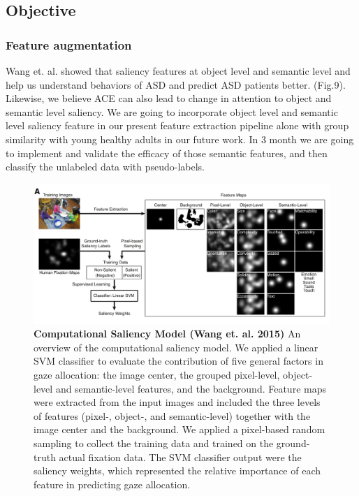 \documentclass[a4paper, times, 12pt, ,onecolumn,oneside,top=1.0cm,bottom=1.0cm,left=1.0 cm,right=1cm]{article}
\begin{document}
\subsection{Objective}

\subsubsection{Feature augmentation} Wang et. al. \cite{pmid26593094} showed that saliency features at object level and semantic level and help us understand behaviors of ASD and predict ASD patients better. (Fig.9). Likewise, we believe ACE can also lead to change in attention to object and semantic level saliency. We are going to incorporate object level and semantic level saliency feature in our present feature extraction pipeline alone with group similarity with young healthy adults in our future work. In 3 month we are going to implement and validate the efficacy of those semantic features, and then classify the unlabeled data with pseudo-labels.


\begin{figure}[ht]
  \centering
  \includegraphics[scale = 0.4]{imgs/wang_pipeline.png}
  \caption{\textbf{Computational Saliency Model (Wang et. al. 2015)\cite{pmid26593094}}  An overview of the computational saliency model. We applied a linear SVM classifier to evaluate the contribution of five general factors in gaze allocation: the image center, the grouped pixel-level, object-level and semantic-level features, and the background. Feature maps were extracted from the input images and included the three levels of features (pixel-, object-, and semantic-level) together with the image center and the background. We applied a pixel-based random sampling to collect the training data and trained on the ground-truth actual fixation data. The SVM classifier output were the saliency weights, which represented the relative importance of each feature in predicting gaze allocation.}
  
  \end{figure}
\end{document}
